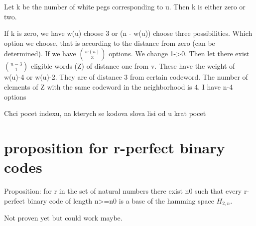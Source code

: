 Let k be the number of white pegs corresponding to u. Then k is either zero or two. 

If k is zero, we have w(u) choose 3 or (n - w(u)) choose three possibilities. Which option we choose, that is according to the distance from zero (can be determined). If we have $\binom{w(u)}{3}$ options. We change 1->0. Then let there exist $\binom{n-3}{1}$ eligible words (Z) of distance one from v. These have the weight of w(u)-4 or w(u)-2. They are of distance 3 from certain codeword. The number of elements of Z with the same codeword in the neighborhood is 4. I have n-4 options 

Chci pocet indexu, na kterych se kodova slova lisi od u krat pocet 

\section{proposition for r-perfect binary codes}
Proposition: for r in the set of natural numbers there exist n0 such that every r-perfect binary code of length n>=n0 is a base of the hamming space $H_{2,n}$.

Not proven yet but could work maybe.
